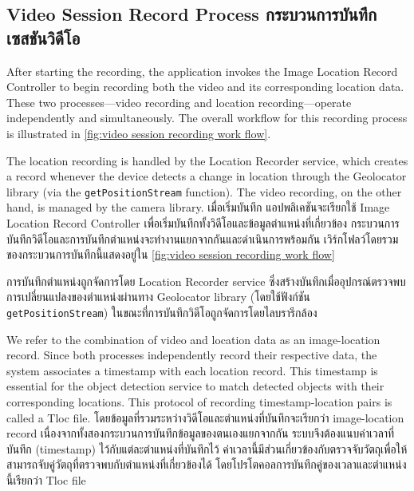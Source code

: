 \subsection{\ifenglish Video Session Record Process \else กระบวนการบันทึกเซสชันวิดีโอ \fi}

\ifenglish
After starting the recording, the application invokes the Image Location Record Controller to begin recording both the video and its corresponding location data. These two processes—video recording and location recording—operate independently and simultaneously. The overall workflow for this recording process is illustrated in \autoref{fig:video session recording work flow}. 

The location recording is handled by the Location Recorder service, which creates a record whenever the device detects a change in location through the Geolocator library (via the \texttt{getPositionStream} function). The video recording, on the other hand, is managed by the camera library.
\else
เมื่อเริ่มบันทึก แอปพลิเคชันจะเรียกใช้ Image Location Record Controller เพื่อเริ่มบันทึกทั้งวิดีโอและข้อมูลตำแหน่งที่เกี่ยวข้อง กระบวนการบันทึกวิดีโอและการบันทึกตำแหน่งจะทำงานแยกจากกันและดำเนินการพร้อมกัน เวิร์กโฟลว์โดยรวมของกระบวนการบันทึกนี้แสดงอยู่ใน \autoref{fig:video session recording work flow} 

การบันทึกตำแหน่งถูกจัดการโดย Location Recorder service ซึ่งสร้างบันทึกเมื่ออุปกรณ์ตรวจพบการเปลี่ยนแปลงของตำแหน่งผ่านทาง Geolocator library (โดยใช้ฟังก์ชัน \texttt{getPositionStream}) ในขณะที่การบันทึกวิดีโอถูกจัดการโดยไลบรารีกล้อง
\fi

\ifenglish
We refer to the combination of video and location data as an image-location record. Since both processes independently record their respective data, the system associates a timestamp with each location record. This timestamp is essential for the object detection service to match detected objects with their corresponding locations. This protocol of recording timestamp-location pairs is called a Tloc file.
\else
โดยข้อมูลที่รวมระหว่างวิดีโอและตำแหน่งที่บันทึกจะเรียกว่า image-location record เนื่องจากทั้งสองกระบวนการบันทึกข้อมูลของตนเองแยกจากกัน ระบบจึงต้องแนบค่าเวลาที่บันทึก (timestamp) ไว้กับแต่ละตำแหน่งที่บันทึกไว้ ค่าเวลานี้มีส่วนเกี่ยวข้องกับตรวจจับวัตถุเพื่อให้สามารถจับคู่วัตถุที่ตรวจพบกับตำแหน่งที่เกี่ยวข้องได้ โดยโปรโตคอลการบันทึกคู่ของเวลาและตำแหน่งนี้เรียกว่า Tloc file
\fi

